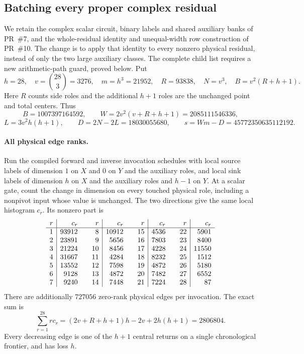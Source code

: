 \subsection{Batching every proper complex residual}
\label{sec:nested-complex}

We retain the complex scalar circuit, binary labels and shared auxiliary
banks of PR~\#7, and the whole-residual identity and unequal-width row
construction of PR~\#10. The change is to apply that identity to every
nonzero physical residual, instead of only the two large auxiliary classes.
The complete child list requires a new arithmetic-path guard, proved below.
Put
\[
 h=28,\quad v=\binom{28}{3}=3276,\quad m=h^3=21952,\quad
 R=93838,\quad N=v^3,\quad B=v^2(R+h+1).
\]
Here $R$ counts side roles and the additional $h+1$ roles are the unchanged
point and total centers. Thus
\[
 B=1007397164592,\qquad W=2v^2(v+R+h+1)=2085111546336,
\]
\[
 L=3v^2h(h+1),\qquad D=2N-2L=18030055680,\qquad
 s=Wm-D=45772350635112192.
\]

\paragraph{All physical edge ranks.}
Run the compiled forward and inverse invocation schedules with local source
labels of dimension $1$ on $X$ and $0$ on $Y$ and the auxiliary roles, and
local sink labels of dimension $h$ on $X$ and the auxiliary roles and $h-1$
on $Y$. At a scalar gate, count the change in dimension on every touched
physical role, including a nonpivot input whose value is unchanged.
The two directions give the same local histogram $c_r$. Its nonzero part is
\[
\begin{array}{r|r@{\qquad}r|r@{\qquad}r|r@{\qquad}r|r}
 r&c_r&r&c_r&r&c_r&r&c_r\\\hline
1 & 93912 & 8 & 10912 & 15 & 4536 & 22 & 5901\\
2 & 23891 & 9 & 5656 & 16 & 7803 & 23 & 8400\\
3 & 21224 & 10 & 8456 & 17 & 4228 & 24 & 11550\\
4 & 31667 & 11 & 4284 & 18 & 8232 & 25 & 1512\\
5 & 13552 & 12 & 7598 & 19 & 4872 & 26 & 5180\\
6 & 9128 & 13 & 4872 & 20 & 7482 & 27 & 6552\\
7 & 9240 & 14 & 7448 & 21 & 7224 & 28 & 87\\
\end{array}
\]
There are additionally $727056$ zero-rank physical edges per invocation.
The exact sum is
\[
 \sum_{r=1}^{28}r c_r
  =(2v+R+h+1)h-2v+2h(h+1)=2806804.
\]
Every decreasing edge is one of the $h+1$ central returns on a single
chronological frontier, and has loss $h$.

